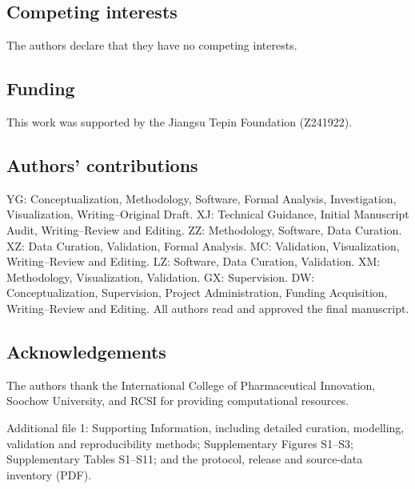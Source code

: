 \documentclass[referee,lineno,pdflatex,sn-vancouver-num]{sn-jnl}
\begin{document}
\subsection*{Competing interests}
The authors declare that they have no competing interests.

\subsection*{Funding}
This work was supported by the Jiangsu Tepin Foundation (Z241922).

\subsection*{Authors' contributions}
YG: Conceptualization, Methodology, Software, Formal Analysis, Investigation, Visualization, Writing--Original Draft. XJ: Technical Guidance, Initial Manuscript Audit, Writing--Review and Editing. ZZ: Methodology, Software, Data Curation. XZ: Data Curation, Validation, Formal Analysis. MC: Validation, Visualization, Writing--Review and Editing. LZ: Software, Data Curation, Validation. XM: Methodology, Visualization, Validation. GX: Supervision. DW: Conceptualization, Supervision, Project Administration, Funding Acquisition, Writing--Review and Editing. All authors read and approved the final manuscript.

\subsection*{Acknowledgements}
The authors thank the International College of Pharmaceutical Innovation, Soochow University, and RCSI for providing computational resources.

Additional file 1: Supporting Information, including detailed curation, modelling, validation and reproducibility methods; Supplementary Figures S1--S3; Supplementary Tables S1--S11; and the protocol, release and source-data inventory (PDF).


\end{document}
